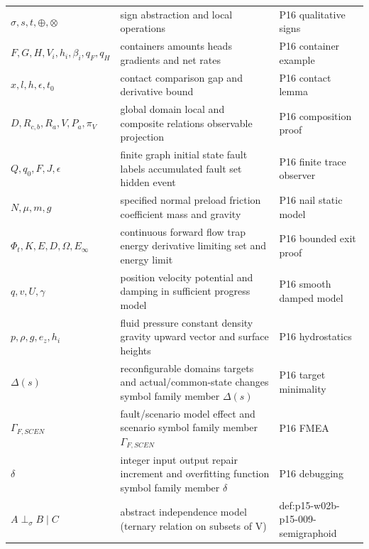 \begin{longtable}{@{}p{}p{}p{}@{}}
\(\sigma,\allowbreak s,\allowbreak t,\allowbreak \oplus,\allowbreak \otimes\) & sign abstraction and local operations & P16 qualitative signs \\
\(F,\allowbreak G,\allowbreak H,\allowbreak V_i,\allowbreak h_i,\allowbreak \beta_i,\allowbreak q_F,\allowbreak q_H\) & containers amounts heads gradients and net rates & P16 container example \\
\(x,\allowbreak l,\allowbreak h,\allowbreak \epsilon,\allowbreak t_0\) & contact comparison gap and derivative bound & P16 contact lemma \\
\(D,\allowbreak R_{c,b},\allowbreak R_a,\allowbreak V,\allowbreak P_a,\allowbreak \pi_V\) & global domain local and composite relations observable projection & P16 composition proof \\
\(Q,\allowbreak q_0,\allowbreak F,\allowbreak J,\allowbreak \epsilon\) & finite graph initial state fault labels accumulated fault set hidden event & P16 finite trace observer \\
\(N,\allowbreak \mu,\allowbreak m,\allowbreak g\) & specified normal preload friction coefficient mass and gravity & P16 nail static model \\
\(\Phi_t,\allowbreak K,\allowbreak E,\allowbreak D,\allowbreak \Omega,\allowbreak E_\infty\) & continuous forward flow trap energy derivative limiting set and energy limit & P16 bounded exit proof \\
\(q,\allowbreak v,\allowbreak U,\allowbreak \gamma\) & position velocity potential and damping in sufficient progress model & P16 smooth damped model \\
\(p,\allowbreak \rho,\allowbreak g,\allowbreak e_z,\allowbreak h_i\) & fluid pressure constant density gravity upward vector and surface heights & P16 hydrostatics \\
\(\Delta(s)\) & reconfigurable domains targets and actual/common-state changes symbol family member \(\Delta(s)\) & P16 target minimality \\
\(\Gamma_{F,SCEN}\) & fault/scenario model effect and scenario symbol family member \(\Gamma_{F,SCEN}\) & P16 FMEA \\
\(\delta\) & integer input output repair increment and overfitting function symbol family member \(\delta\) & P16 debugging \\
\(A\perp_\sigma B\mid C\) & abstract independence model (ternary relation on subsets of V) & def:\allowbreak{}p15-\allowbreak{}w02b-\allowbreak{}p15-\allowbreak{}009-\allowbreak{}semigraphoid \\

\end{longtable}
